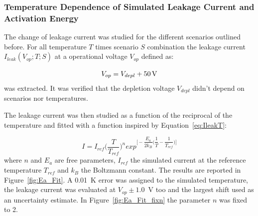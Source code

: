 \subsubsection{Temperature Dependence of Simulated Leakage Current and Activation Energy}

The change of leakage current was studied for the different scenarios outlined before. 
For all temperature $T$ times scenario $S$ combination the leakage current $I_{leak}(V_{op};T;S)$ 
at a 
operational voltage 
$V_{op}$ defined as:

\begin{equation}
V_{op}=V_{depl}+50\,{\rm V}
\label{eq:Vop}
\end{equation} 
was extracted. It was verified that the depletion voltage $V_{depl}$ didn't depend on scenarios nor temperatures.

 The leakage current was then studied as a function of the reciprocal of the 
temperature and fitted with a function inspired by Equation~\ref{eq:IleakT}:

\begin{equation}
I = I_{ref}\Bigg(\dfrac{T}{T_{ref}}\Bigg)^n exp^{\Bigg[ -\dfrac{E_{a}}{2k_B}\Bigg( \dfrac{1}{T}- \dfrac{1}{T_{ref}} \Bigg) \Bigg]}
\label{eq:ITfunc}
\end{equation}
where $n$ and $E_{a}$ are free parameters, $I_{ref}$ the simulated current at the reference 
temperature $T_{ref}$ and $k_B$ the Boltzmann constant.
The results are reported in Figure~\ref{fig:Ea_Fit}. A 0.01~K error was assigned to the 
simulated temperature, the leakage current was evaluated at $V_{op}\pm1.0$~V too and the largest 
shift used as an uncertainty estimate.
In Figure~\ref{fig:Ea_Fit_fixn} the  parameter $n$ was fixed to 2.

